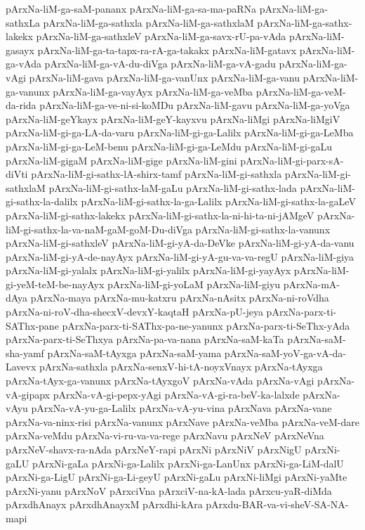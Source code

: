 {pArxNa-liM-ga-saM-pananx
pArxNa-liM-ga-sa-ma-paRNa
pArxNa-liM-ga-sathxLa
pArxNa-liM-ga-sathxla
pArxNa-liM-ga-sathxlaM
pArxNa-liM-ga-sathx-lakekx
pArxNa-liM-ga-sathxleV
pArxNa-liM-ga-savx-rU-pa-vAda
pArxNa-liM-gasayx
pArxNa-liM-ga-ta-tapx-ra-rA-ga-takakx
pArxNa-liM-gatavx
pArxNa-liM-ga-vAda
pArxNa-liM-ga-vA-du-diVga
pArxNa-liM-ga-vA-gadu
pArxNa-liM-ga-vAgi
pArxNa-liM-gava
pArxNa-liM-ga-vanUnx
pArxNa-liM-ga-vanu
pArxNa-liM-ga-vanunx
pArxNa-liM-ga-vayAyx
pArxNa-liM-ga-veMba
pArxNa-liM-ga-veM-da-rida
pArxNa-liM-ga-ve-ni-si-koMDu
pArxNa-liM-gavu
pArxNa-liM-ga-yoVga
pArxNa-liM-geYkayx
pArxNa-liM-geY-kayxvu
pArxNa-liMgi
pArxNa-liMgiV
pArxNa-liM-gi-ga-LA-da-varu
pArxNa-liM-gi-ga-Lalilx
pArxNa-liM-gi-ga-LeMba
pArxNa-liM-gi-ga-LeM-benu
pArxNa-liM-gi-ga-LeMdu
pArxNa-liM-gi-gaLu
pArxNa-liM-gigaM
pArxNa-liM-gige
pArxNa-liM-gini
pArxNa-liM-gi-parx-sA-diVti
pArxNa-liM-gi-sathx-lA-shirx-tamf
pArxNa-liM-gi-sathxla
pArxNa-liM-gi-sathxlaM
pArxNa-liM-gi-sathx-laM-gaLu
pArxNa-liM-gi-sathx-lada
pArxNa-liM-gi-sathx-la-dalilx
pArxNa-liM-gi-sathx-la-ga-Lalilx
pArxNa-liM-gi-sathx-la-gaLeV
pArxNa-liM-gi-sathx-lakekx
pArxNa-liM-gi-sathx-la-ni-hi-ta-ni-jAMgeV
pArxNa-liM-gi-sathx-la-va-naM-gaM-goM-Du-diVga
pArxNa-liM-gi-sathx-la-vanunx
pArxNa-liM-gi-sathxleV
pArxNa-liM-gi-yA-da-DeVke
pArxNa-liM-gi-yA-da-vanu
pArxNa-liM-gi-yA-de-nayAyx
pArxNa-liM-gi-yA-gu-va-va-regU
pArxNa-liM-giya
pArxNa-liM-gi-yalalx
pArxNa-liM-gi-yalilx
pArxNa-liM-gi-yayAyx
pArxNa-liM-gi-yeM-teM-be-nayAyx
pArxNa-liM-gi-yoLaM
pArxNa-liM-giyu
pArxNa-mA-dAya
pArxNa-maya
pArxNa-mu-katxru
pArxNa-nAsitx
pArxNa-ni-roVdha
pArxNa-ni-roV-dha-shecxV-devxY-kaqtaH
pArxNa-pU-jeya
pArxNa-parx-ti-SAThx-pane
pArxNa-parx-ti-SAThx-pa-ne-yanunx
pArxNa-parx-ti-SeThx-yAda
pArxNa-parx-ti-SeThxya
pArxNa-pa-va-nana
pArxNa-saM-kaTa
pArxNa-saM-sha-yamf
pArxNa-saM-tAyxga
pArxNa-saM-yama
pArxNa-saM-yoV-ga-vA-da-Lavevx
pArxNa-sathxla
pArxNa-senxV-hi-tA-noyxVnayx
pArxNa-tAyxga
pArxNa-tAyx-ga-vanunx
pArxNa-tAyxgoV
pArxNa-vAda
pArxNa-vAgi
pArxNa-vA-gipapx
pArxNa-vA-gi-pepx-yAgi
pArxNa-vA-gi-ra-beV-ka-lalxde
pArxNa-vAyu
pArxNa-vA-yu-ga-Lalilx
pArxNa-vA-yu-vina
pArxNava
pArxNa-vane
pArxNa-va-ninx-risi
pArxNa-vanunx
pArxNave
pArxNa-veMba
pArxNa-veM-dare
pArxNa-veMdu
pArxNa-vi-ru-va-va-rege
pArxNavu
pArxNeV
pArxNeVna
pArxNeV-shavx-ra-nAda
pArxNeY-rapi
pArxNi
pArxNiV
pArxNigU
pArxNi-gaLU
pArxNi-gaLa
pArxNi-ga-Lalilx
pArxNi-ga-LanUnx
pArxNi-ga-LiM-dalU
pArxNi-ga-LigU
pArxNi-ga-Li-geyU
pArxNi-gaLu
pArxNi-liMgi
pArxNi-yaMte
pArxNi-yanu
pArxNoV
pArxciVna
pArxciV-na-kA-lada
pArxcu-yaR-diMda
pArxdhAnayx
pArxdhAnayxM
pArxdhi-kAra
pArxdu-BAR-va-vi-sheV-SA-NA-mapi
}
